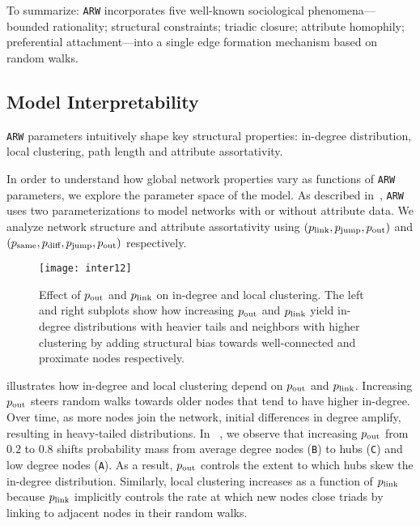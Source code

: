 To summarize: \texttt{ARW} incorporates five well-known sociological
phenomena--- bounded rationality; structural constraints; triadic closure;
attribute homophily; preferential attachment---into a single edge formation
mechanism based on random walks.


\subsection{Model Interpretability}
\texttt{ARW} parameters intuitively shape key structural properties:
in-degree distribution, local clustering, path length and attribute assortativity.

In order to understand how global network properties vary as functions of
\texttt{ARW} parameters, we explore the parameter space of the model. As
described in~, \texttt{ARW} uses two
parameterizations to model networks with or without attribute data. We analyze
network structure and attribute assortativity using $(p_{\scriptsize\mbox{link}}, p_{\scriptsize\mbox{jump}}, p_{\scriptsize\mbox{out}})$
and $(p_{\scriptsize\mbox{same}}, p_{\scriptsize\mbox{diff}}, p_{\scriptsize\mbox{jump}}, p_{\scriptsize\mbox{out}})$ respectively.

\begin{figure}[b]
 \centering
 \texttt{[image: inter12]}
 \caption
 {Effect of $p_{\scriptsize\mbox{out}}$ and $p_{\scriptsize\mbox{link}}$ on in-degree and local clustering.
 The left and right subplots show how increasing $p_{\scriptsize\mbox{out}}$ and $p_{\scriptsize\mbox{link}}$ yield
 in-degree distributions with heavier tails and neighbors with higher clustering
 by adding structural bias towards well-connected and proximate nodes respectively.}
 \label{fig:inter1}
\end{figure}

 illustrates how in-degree and local clustering depend on $p_{\scriptsize\mbox{out}}$ and $p_{\scriptsize\mbox{link}}$.
Increasing $p_{\scriptsize\mbox{out}}$ steers random walks towards older nodes that tend to have higher in-degree.
Over time, as more nodes join the network, initial differences in degree amplify, resulting in heavy-tailed distributions.
In ~, we observe that increasing $p_{\scriptsize\mbox{out}}$ from $0.2$ to $0.8$ shifts probability
mass from average degree nodes (\texttt{B}) to hubs (\texttt{C}) and low degree nodes (\texttt{A}).
As a result, $p_{\scriptsize\mbox{out}}$ controls the extent to which hubs skew the in-degree distribution.
Similarly, local clustering increases as a function of $p_{\scriptsize\mbox{link}}$ because $p_{\scriptsize\mbox{link}}$ implicitly
controls the rate at which new nodes close triads by linking to adjacent nodes in their random walks.

